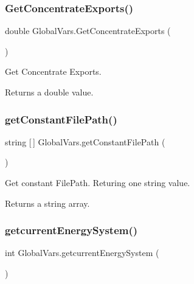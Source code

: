 \subsubsection{\texorpdfstring{GetConcentrateExports()}{GetConcentrateExports()}}
{\footnotesize\ttfamily double Global\+Vars.\+Get\+Concentrate\+Exports (\begin{DoxyParamCaption}{ }\end{DoxyParamCaption})\hspace{0.3cm}{\ttfamily [inline]}}



Get Concentrate Exports. 

\begin{DoxyReturn}{Returns}
a double value. 
\end{DoxyReturn}
\mbox{\label{class_global_vars_ae5a4efdbf57ef0076ec3cb07af28d6fe}} 
\subsubsection{\texorpdfstring{getConstantFilePath()}{getConstantFilePath()}}
{\footnotesize\ttfamily string \mbox{[}$\,$\mbox{]} Global\+Vars.\+get\+Constant\+File\+Path (\begin{DoxyParamCaption}{ }\end{DoxyParamCaption})\hspace{0.3cm}{\ttfamily [inline]}}



Get constant File\+Path. Returing one string value. 

\begin{DoxyReturn}{Returns}
a string array. 
\end{DoxyReturn}
\mbox{\label{class_global_vars_a6d119976a50903086643fcadca3ceeac}} 
\subsubsection{\texorpdfstring{getcurrentEnergySystem()}{getcurrentEnergySystem()}}
{\footnotesize\ttfamily int Global\+Vars.\+getcurrent\+Energy\+System (\begin{DoxyParamCaption}{ }\end{DoxyParamCaption})\hspace{0.3cm}{\ttfamily [inline]}}



